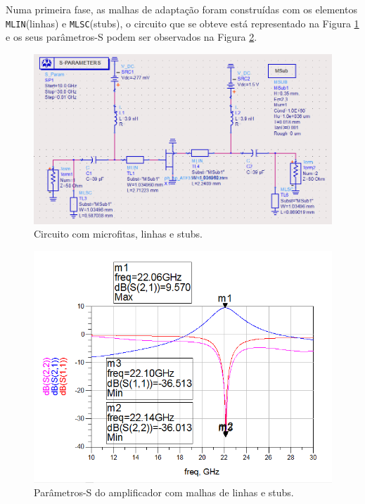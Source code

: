 \documentclass[11pt]{article}
\numberwithin{equation}{section}
\begin{document}
Numa primeira fase, as malhas de adaptação foram construídas com os elementos \texttt{MLIN}(linhas) e \texttt{MLSC}(stubs), o circuito que se obteve está representado na Figura \ref{fig:mf_stub_circuito} e os seus parâmetros-S podem ser observados na Figura \ref{fig:mf_stub_S}.

\begin{figure}[H]
	\centering
	\includegraphics[keepaspectratio=true, scale=0.45]{exps/Circuito_mf_stub}
	\vspace{-0.5em}
	\caption{Circuito com microfitas, linhas e stubs.}
	\vspace{-0.8em}
	\label{fig:mf_stub_circuito}
\end{figure}

\begin{figure}[H]
	\centering
	\includegraphics[keepaspectratio=true, scale=0.45]{exps/mf_stub_S}
	\vspace{-0.5em}
	\caption{Parâmetros-S do amplificador com malhas de linhas e stubs.}
	\vspace{-0.8em}
	\label{fig:mf_stub_S}
\end{figure}
\end{document}
